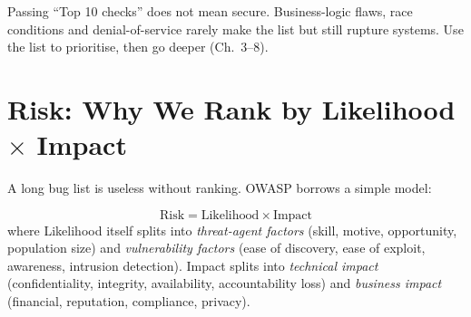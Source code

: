 \begin{remark}
Passing ``Top 10 checks'' does not mean secure. Business-logic flaws, race conditions and denial-of-service rarely make the list but still rupture systems. Use the list to prioritise, then go deeper (Ch.~3--8).
\end{remark}

\section{\texorpdfstring{Risk: Why We Rank by Likelihood $\times$ Impact}{Risk: Why We Rank by Likelihood x Impact}}\label{sec:risk}
A long bug list is useless without ranking. OWASP borrows a simple model:

\begin{equation}\label{eq:risk}
\text{Risk} = \text{Likelihood} \times \text{Impact}
\end{equation}
where Likelihood itself splits into \emph{threat-agent factors} (skill, motive, opportunity, population size) and \emph{vulnerability factors} (ease of discovery, ease of exploit, awareness, intrusion detection). Impact splits into \emph{technical impact} (confidentiality, integrity, availability, accountability loss) and \emph{business impact} (financial, reputation, compliance, privacy).

